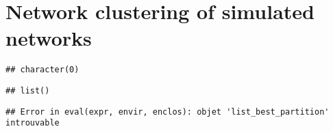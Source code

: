 \section{Network clustering of simulated networks}\label{sec:network-clustering-of-simulated-networks}

\begin{verbatim}
## character(0)
\end{verbatim}

\begin{verbatim}
## list()
\end{verbatim}

\begin{verbatim}
## Error in eval(expr, envir, enclos): objet 'list_best_partition' introuvable
\end{verbatim}
